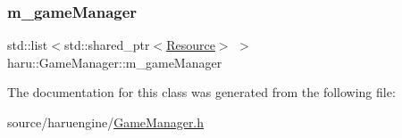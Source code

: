 \subsubsection{\texorpdfstring{m\+\_\+game\+Manager}{m\_gameManager}}
{\footnotesize\ttfamily std\+::list$<$std\+::shared\+\_\+ptr$<$\mbox{\hyperlink{classharu_1_1_resource}{Resource}}$>$ $>$ haru\+::\+Game\+Manager\+::m\+\_\+game\+Manager\hspace{0.3cm}{\ttfamily [private]}}



The documentation for this class was generated from the following file\+:\begin{DoxyCompactItemize}
\item 
source/haruengine/\mbox{\hyperlink{_game_manager_8h}{Game\+Manager.\+h}}\end{DoxyCompactItemize}
